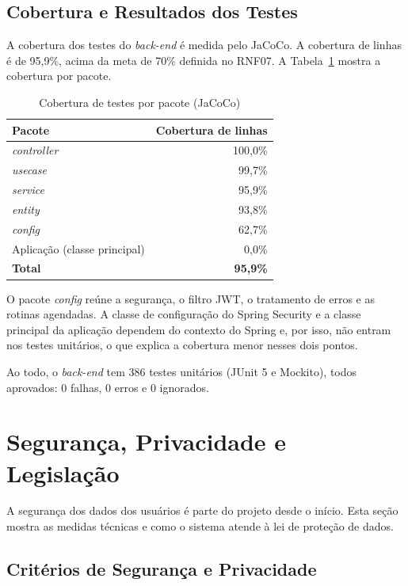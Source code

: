 \subsection{Cobertura e Resultados dos Testes}

A cobertura dos testes do \textit{back-end} é medida pelo JaCoCo. A cobertura de linhas é de 95,9\%, acima da meta de 70\% definida no RNF07. A Tabela~\ref{tab:cobertura} mostra a cobertura por pacote.

\begin{table}[H]
\centering
\caption{Cobertura de testes por pacote (JaCoCo)}
\label{tab:cobertura}
\begin{tabular}{|l|r|}
\hline
\textbf{Pacote} & \textbf{Cobertura de linhas} \\
\hline
\textit{controller} & 100,0\% \\
\hline
\textit{usecase} & 99,7\% \\
\hline
\textit{service} & 95,9\% \\
\hline
\textit{entity} & 93,8\% \\
\hline
\textit{config} & 62,7\% \\
\hline
Aplicação (classe principal) & 0,0\% \\
\hline
\textbf{Total} & \textbf{95,9\%} \\
\hline
\end{tabular}
\end{table}

O pacote \textit{config} reúne a segurança, o filtro JWT, o tratamento de erros e as rotinas agendadas. A classe de configuração do Spring Security e a classe principal da aplicação dependem do contexto do Spring e, por isso, não entram nos testes unitários, o que explica a cobertura menor nesses dois pontos.

Ao todo, o \textit{back-end} tem 386 testes unitários (JUnit 5 e Mockito), todos aprovados: 0 falhas, 0 erros e 0 ignorados.

\section{Segurança, Privacidade e Legislação}

A segurança dos dados dos usuários é parte do projeto desde o início. Esta seção mostra as medidas técnicas e como o sistema atende à lei de proteção de dados.

\subsection{Critérios de Segurança e Privacidade}


